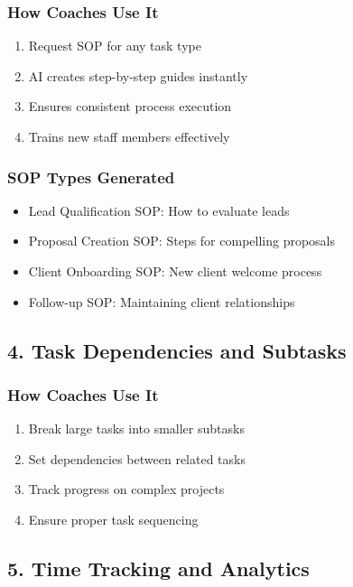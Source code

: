 \documentclass[12pt,a4paper]{article}
\begin{document}
\subsubsection{How Coaches Use It}
\begin{enumerate}
    \item Request SOP for any task type
    \item AI creates step-by-step guides instantly
    \item Ensures consistent process execution
    \item Trains new staff members effectively
\end{enumerate}

\subsubsection{SOP Types Generated}
\begin{itemize}
    \item Lead Qualification SOP: How to evaluate leads
    \item Proposal Creation SOP: Steps for compelling proposals
    \item Client Onboarding SOP: New client welcome process
    \item Follow-up SOP: Maintaining client relationships
\end{itemize}

\subsection{4. Task Dependencies and Subtasks}

\subsubsection{How Coaches Use It}
\begin{enumerate}
    \item Break large tasks into smaller subtasks
    \item Set dependencies between related tasks
    \item Track progress on complex projects
    \item Ensure proper task sequencing
\end{enumerate}

\subsection{5. Time Tracking and Analytics}
\end{document}
